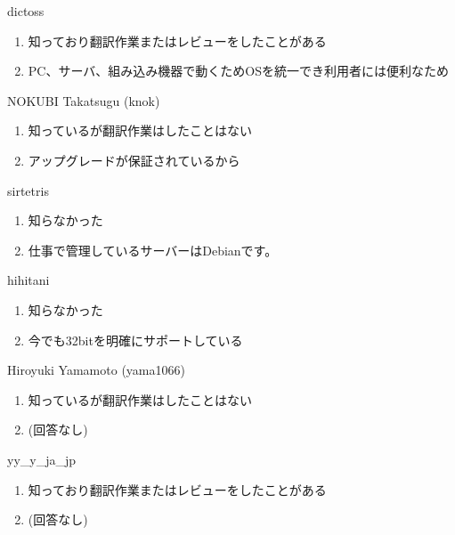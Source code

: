 \begin{prework}{ dictoss }
  \begin{enumerate}
  \item 知っており翻訳作業またはレビューをしたことがある
  \item PC、サーバ、組み込み機器で動くためOSを統一でき利用者には便利なため
  \end{enumerate}
\end{prework}

\begin{prework}{ NOKUBI Takatsugu (knok) }
  \begin{enumerate}
  \item 知っているが翻訳作業はしたことはない
  \item アップグレードが保証されているから
  \end{enumerate}
\end{prework}

\begin{prework}{ sirtetris }
  \begin{enumerate}
  \item 知らなかった
  \item 仕事で管理しているサーバーはDebianです。
  \end{enumerate}
\end{prework}

\begin{prework}{ hihitani }
  \begin{enumerate}
  \item 知らなかった
  \item 今でも32bitを明確にサポートしている
  \end{enumerate}
\end{prework}

\begin{prework}{ Hiroyuki Yamamoto (yama1066) }
  \begin{enumerate}
  \item 知っているが翻訳作業はしたことはない
  \item (回答なし)
  \end{enumerate}
\end{prework}

\begin{prework}{ yy\_y\_ja\_jp }
  \begin{enumerate}
  \item 知っており翻訳作業またはレビューをしたことがある
  \item (回答なし)
  \end{enumerate}
\end{prework}

